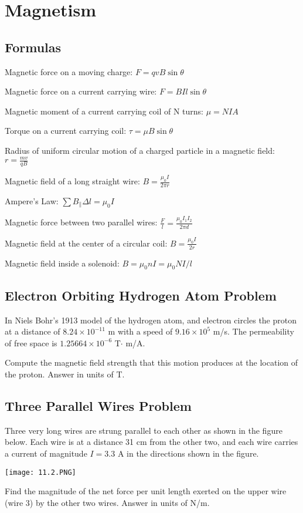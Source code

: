 \documentclass[../physics12.tex]{subfiles}
\begin{document}
\chapter{Magnetism}
\section{Formulas}
Magnetic force on a moving charge: $F=qvB\sin\theta$

Magnetic force on a current carrying wire: $F=BIl\sin\theta$

Magnetic moment of a current carrying coil of N turns: $\mu = NIA$

Torque on a current carrying coil: $\tau = \mu B \sin\theta$

Radius of uniform circular motion of a charged particle in a magnetic field: $r=\frac{mv}{qB}$

Magnetic field of a long straight wire: $B=\frac{\mu_0 I}{2\pi r}$

Ampere's Law: $\sum B_{\parallel}\Delta l = \mu_0 I$

Magnetic force between two parallel wires: $\frac{F}{l} = \frac{\mu_0 I_1 I_2}{2\pi d}$

Magnetic field at the center of a circular coil: $B = \frac{\mu_0 I}{2r}$

Magnetic field inside a solenoid: $B = \mu_0 nI = \mu_0 NI/l$

\section{Electron Orbiting Hydrogen Atom Problem}
In Niels Bohr's 1913 model of the hydrogen atom, and electron circles the proton at a distance of $8.24\times 10^{-11}$ m with a speed of $9.16\times 10^5$ m/s.
The permeability of free space is $1.25664\times 10^{-6}$ T$\cdot$ m/A.

Compute the magnetic field strength that this motion produces at the location of the proton. Answer in units of T.

\section{Three Parallel Wires Problem}
Three very long wires are strung parallel to each other as shown in the figure below. Each wire is at a distance 31 cm from the other two, and each wire carries a current of 
magnitude $I=3.3$ A in the directions shown in the figure.
\begin{center}
    \texttt{[image: 11.2.PNG]}
\end{center}
Find the magnitude of the net force per unit length exerted on the upper wire (wire 3) by the other two wires. Answer in units of N/m.
\end{document}
